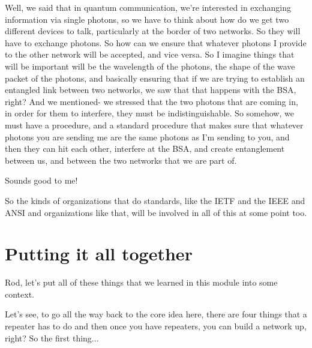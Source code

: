\mmm Well, we said that in quantum communication, we're interested in exchanging information via single photons, so we have to think about how do we get two different devices to talk, particularly at the border of two networks. So they will have to exchange photons. So how can we ensure that whatever photons I provide to the other network will be accepted, and vice versa. So I imagine things that will be important will be the wavelength of the photons, the shape of the wave packet of the photons, and basically ensuring that if we are trying to establish an entangled link between two networks, we saw that that happens with the BSA, right? And we mentioned- we stressed that the two photons that are coming in, in order for them to interfere, they must be indistinguishable. So somehow, we must have a procedure, and a standard procedure that makes sure that whatever photons you are sending me are the same photons as I'm sending to you, and then they can hit each other, interfere at the BSA, and create entanglement between us, and between the two networks that we are part of.

\rrr Sounds good to me!

So the kinds of organizations that do standards, like the IETF and the IEEE and ANSI and organizations like that, will be involved in all of this at some point too.

\section{Putting it all together}


\mmm Rod, let's put all of these things that we learned in this module into some context.



\rrr Let's see, to go all the way back to the core idea here, there are four things that a repeater has to do and then once you have repeaters, you can build a network up, right? So the first thing...

